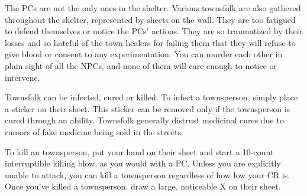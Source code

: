 \documentclass[green]{Pestilence}
\begin{document}
\name{\gTownsfolk{}}

The PCs are not the only ones in the shelter. Various townsfolk are also gathered throughout the shelter, represented by sheets on the wall. They are too fatigued to defend themselves or notice the PCs' actions. They are so traumatized by their losses and so hateful of the town healers for failing them that they will refuse to give blood or consent to any experimentation. You can murder each other in plain sight of all the NPCs, and none of them will care enough to notice or intervene.

Townsfolk can be infected, cured or killed. To infect a townsperson, simply place a sticker on their sheet. This sticker can be removed only if the townsperson is cured through an ability. Townsfolk generally distrust medicinal cures due to rumors of fake medicine being sold in the streets.

To kill an townsperson, put your hand on their sheet and start a 10-count interruptible killing blow, as you would with a PC. Unless you are explicitly unable to attack, you can kill a townsperson regardless of how low your CR is. Once you've killed a townsperson, draw a large, noticeable X on their sheet.
\end{document}
